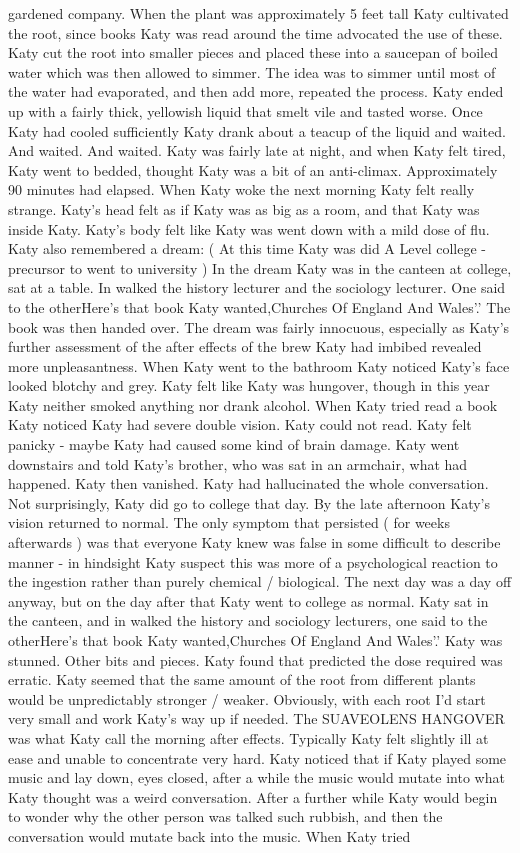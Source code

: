 \documentclass[12pt]{book}
\begin{document}
gardened company. When the plant was approximately 5 feet tall Katy cultivated the root, since books Katy was read around the time advocated the use of these. Katy cut the root into smaller pieces and placed these into a saucepan of boiled water which was then allowed to simmer. The idea was to simmer until most of the water had evaporated, and then add more, repeated the process. Katy ended up with a fairly thick, yellowish liquid that smelt vile and tasted worse. Once Katy had cooled sufficiently Katy drank about a teacup of the liquid and waited. And waited. And waited. Katy was fairly late at night, and when Katy felt tired, Katy went to bedded, thought Katy was a bit of an anti-climax. Approximately 90 minutes had elapsed. When Katy woke the next morning Katy felt really strange. Katy's head felt as if Katy was as big as a room, and that Katy was inside Katy. Katy's body felt like Katy was went down with a mild dose of flu. Katy also remembered a dream: ( At this time Katy was did A Level college - precursor to went to university ) In the dream Katy was in the canteen at college, sat at a table. In walked the history lecturer and the sociology lecturer. One said to the otherHere's that book Katy wanted,Churches Of England And Wales'.' The book was then handed over. The dream was fairly innocuous, especially as Katy's further assessment of the after effects of the brew Katy had imbibed revealed more unpleasantness. When Katy went to the bathroom Katy noticed Katy's face looked blotchy and grey. Katy felt like Katy was hungover, though in this year Katy neither smoked anything nor drank alcohol. When Katy tried read a book Katy noticed Katy had severe double vision. Katy could not read. Katy felt panicky - maybe Katy had caused some kind of brain damage. Katy went downstairs and told Katy's brother, who was sat in an armchair, what had happened. Katy then vanished. Katy had hallucinated the whole conversation. Not surprisingly, Katy did go to college that day. By the late afternoon Katy's vision returned to normal. The only symptom that persisted ( for weeks afterwards ) was that everyone Katy knew was false in some difficult to describe manner - in hindsight Katy suspect this was more of a psychological reaction to the ingestion rather than purely chemical / biological. The next day was a day off anyway, but on the day after that Katy went to college as normal. Katy sat in the canteen, and in walked the history and sociology lecturers, one said to the otherHere's that book Katy wanted,Churches Of England And Wales'.' Katy was stunned. Other bits and pieces. Katy found that predicted the dose required was erratic. Katy seemed that the same amount of the root from different plants would be unpredictably stronger / weaker. Obviously, with each root I'd start very small and work Katy's way up if needed. The SUAVEOLENS HANGOVER was what Katy call the morning after effects. Typically Katy felt slightly ill at ease and unable to concentrate very hard. Katy noticed that if Katy played some music and lay down, eyes closed, after a while the music would mutate into what Katy thought was a weird conversation. After a further while Katy would begin to wonder why the other person was talked such rubbish, and then the conversation would mutate back into the music. When Katy tried 
\end{document}
